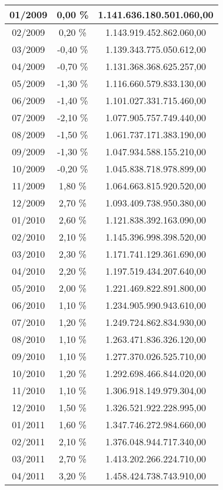 \begin{center}
\begin{longtable}{|c|c|c|}
01/2009 & 0,00 \% & 1.141.636.180.501.060,00 \\ \hline
02/2009 & 0,20 \% & 1.143.919.452.862.060,00 \\ \hline
03/2009 & -0,40 \% & 1.139.343.775.050.612,00 \\ \hline
04/2009 & -0,70 \% & 1.131.368.368.625.257,00 \\ \hline
05/2009 & -1,30 \% & 1.116.660.579.833.130,00 \\ \hline
06/2009 & -1,40 \% & 1.101.027.331.715.460,00 \\ \hline
07/2009 & -2,10 \% & 1.077.905.757.749.440,00 \\ \hline
08/2009 & -1,50 \% & 1.061.737.171.383.190,00 \\ \hline
09/2009 & -1,30 \% & 1.047.934.588.155.210,00 \\ \hline
10/2009 & -0,20 \% & 1.045.838.718.978.899,00 \\ \hline
11/2009 & 1,80 \% & 1.064.663.815.920.520,00 \\ \hline
12/2009 & 2,70 \% & 1.093.409.738.950.380,00 \\ \hline
01/2010 & 2,60 \% & 1.121.838.392.163.090,00 \\ \hline
02/2010 & 2,10 \% & 1.145.396.998.398.520,00 \\ \hline
03/2010 & 2,30 \% & 1.171.741.129.361.690,00 \\ \hline
04/2010 & 2,20 \% & 1.197.519.434.207.640,00 \\ \hline
05/2010 & 2,00 \% & 1.221.469.822.891.800,00 \\ \hline
06/2010 & 1,10 \% & 1.234.905.990.943.610,00 \\ \hline
07/2010 & 1,20 \% & 1.249.724.862.834.930,00 \\ \hline
08/2010 & 1,10 \% & 1.263.471.836.326.120,00 \\ \hline
09/2010 & 1,10 \% & 1.277.370.026.525.710,00 \\ \hline
10/2010 & 1,20 \% & 1.292.698.466.844.020,00 \\ \hline
11/2010 & 1,10 \% & 1.306.918.149.979.304,00 \\ \hline
12/2010 & 1,50 \% & 1.326.521.922.228.995,00 \\ \hline
01/2011 & 1,60 \% & 1.347.746.272.984.660,00 \\ \hline
02/2011 & 2,10 \% & 1.376.048.944.717.340,00 \\ \hline
03/2011 & 2,70 \% & 1.413.202.266.224.710,00 \\ \hline
04/2011 & 3,20 \% & 1.458.424.738.743.910,00 \\ \hline

\end{longtable}
\end{center}
